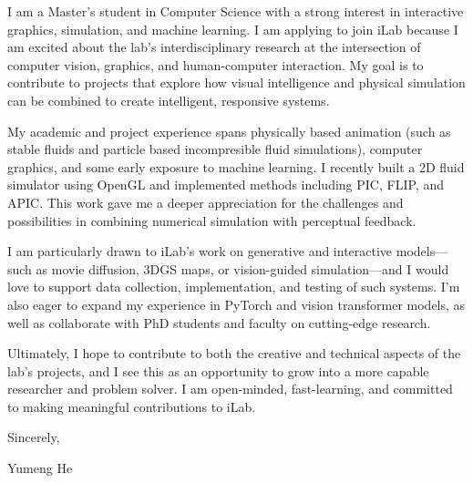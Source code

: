 \documentclass[letterpaper,11pt]{article}
\begin{document}


I am a Master’s student in Computer Science with a strong interest in interactive graphics, simulation, and machine learning. I am applying to join iLab because I am excited about the lab’s interdisciplinary research at the intersection of computer vision, graphics, and human-computer interaction. My goal is to contribute to projects that explore how visual intelligence and physical simulation can be combined to create intelligent, responsive systems.

\bigskip

My academic and project experience spans physically based animation (such as stable fluids and particle based incompresible fluid simulations), computer graphics, and some early exposure to machine learning. I recently built a 2D fluid simulator using OpenGL and implemented methods including PIC, FLIP, and APIC. This work gave me a deeper appreciation for the challenges and possibilities in combining numerical simulation with perceptual feedback.

\bigskip

I am particularly drawn to iLab’s work on generative and interactive models—such as movie diffusion, 3DGS maps, or vision-guided simulation—and I would love to support data collection, implementation, and testing of such systems. I’m also eager to expand my experience in PyTorch and vision transformer models, as well as collaborate with PhD students and faculty on cutting-edge research.

\bigskip

Ultimately, I hope to contribute to both the creative and technical aspects of the lab’s projects, and I see this as an opportunity to grow into a more capable researcher and problem solver. I am open-minded, fast-learning, and committed to making meaningful contributions to iLab.

\bigskip

Sincerely,

\vspace{50pt}

Yumeng He
\end{document}
